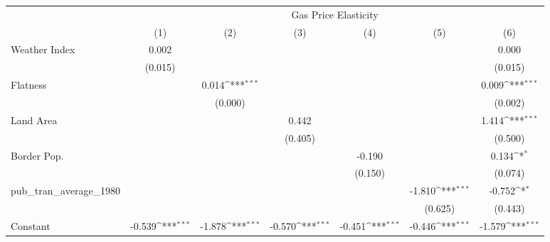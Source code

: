 {
\def\sym#1{\ifmmode^{#1}\else\(^{#1}\)\fi}
\begin{tabular}{l*{6}{c}}
\hline\hline
            &\multicolumn{6}{c}{Gas Price Elasticity}                                                                                           \\
            &\multicolumn{1}{c}{(1)}         &\multicolumn{1}{c}{(2)}         &\multicolumn{1}{c}{(3)}         &\multicolumn{1}{c}{(4)}         &\multicolumn{1}{c}{(5)}         &\multicolumn{1}{c}{(6)}         \\
\hline
Weather Index&       0.002         &                     &                     &                     &                     &       0.000         \\
            &     (0.015)         &                     &                     &                     &                     &     (0.015)         \\
[1em]
Flatness    &                     &       0.014\sym{***}&                     &                     &                     &       0.009\sym{***}\\
            &                     &     (0.000)         &                     &                     &                     &     (0.002)         \\
[1em]
Land Area   &                     &                     &       0.442         &                     &                     &       1.414\sym{***}\\
            &                     &                     &     (0.405)         &                     &                     &     (0.500)         \\
[1em]
Border Pop. &                     &                     &                     &      -0.190         &                     &       0.134\sym{*}  \\
            &                     &                     &                     &     (0.150)         &                     &     (0.074)         \\
[1em]
pub\_tran\_average\_1980&                     &                     &                     &                     &      -1.810\sym{***}&      -0.752\sym{*}  \\
            &                     &                     &                     &                     &     (0.625)         &     (0.443)         \\
[1em]
Constant    &      -0.539\sym{***}&      -1.878\sym{***}&      -0.570\sym{***}&      -0.451\sym{***}&      -0.446\sym{***}&      -1.579\sym{***}\\

\end{tabular}}
